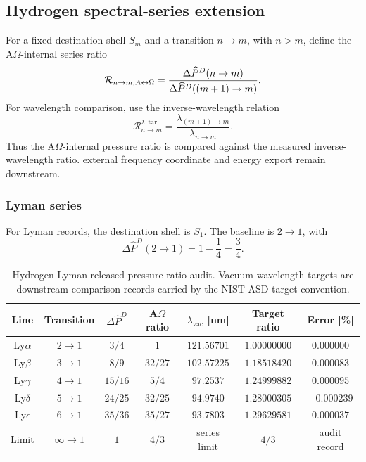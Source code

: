 \subsection{Hydrogen spectral-series extension}\label{manual:hydrogen:spectral-extension}

For a fixed destination shell \(S_m\) and a transition \(n\to m\), with \(n>m\), define the A\(\Omega\)-internal series ratio
\[
\mathcal R_{n\to m,A{\leftrightarrow}\Omega}
=
\frac{\Delta\widehat P^D(n\to m)}{\Delta\widehat P^D((m+1)\to m)}.
\]
For wavelength comparison, use the inverse-wavelength relation
\[
\mathcal R^{\lambda,\mathrm{tar}}_{n\to m}
=
\frac{\lambda_{(m+1)\to m}}{\lambda_{n\to m}}.
\]
Thus the A\(\Omega\)-internal pressure ratio is compared against the measured inverse-wavelength ratio. external frequency coordinate and energy export remain downstream.

\subsubsection{Lyman series}\label{manual:hydrogen:lyman}
For Lyman records, the destination shell is \(S_1\). The baseline is \(2\to1\), with
\[
\Delta\widehat P^D(2\to1)=1-\frac14=\frac34.
\]

\begin{table}[h]
\centering
\scriptsize
\caption{Hydrogen Lyman released-pressure ratio audit. Vacuum wavelength targets are downstream comparison records carried by the NIST-ASD target convention.}
\begin{tabular}{c c c c c c c}
\toprule
Line & Transition & $\Delta\widehat P^D$ & A\(\Omega\) ratio & $\lambda_{\mathrm{vac}}$ [nm] & Target ratio & Error [\%]\\
\midrule
Ly$\alpha$ & $2\to1$ & $3/4$ & $1$ & $121.56701$ & $1.00000000$ & $0.000000$\\
Ly$\beta$ & $3\to1$ & $8/9$ & $32/27$ & $102.57225$ & $1.18518420$ & $0.000083$\\
Ly$\gamma$ & $4\to1$ & $15/16$ & $5/4$ & $97.2537$ & $1.24999882$ & $0.000095$\\
Ly$\delta$ & $5\to1$ & $24/25$ & $32/25$ & $94.9740$ & $1.28000305$ & $-0.000239$\\
Ly$\epsilon$ & $6\to1$ & $35/36$ & $35/27$ & $93.7803$ & $1.29629581$ & $0.000037$\\
Limit & $\infty\to1$ & $1$ & $4/3$ & series limit & $4/3$ & audit record\\
\bottomrule
\end{tabular}
\label{tab:manual-hydrogen-lyman-ratios}
\end{table}

